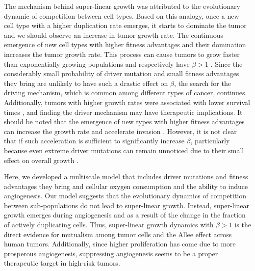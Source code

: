 \documentclass[aps,prl, superscriptaddress,groupedaddress]{revtex4}  %
\begin{document}
	The mechanism behind super-linear growth was attributed to the evolutionary dynamic of competition between cell types. Based on this analogy, once a new cell type with a higher duplication rate emerges, it starts to dominate the tumor and we should observe an increase in tumor growth rate. The continuous emergence of new cell types with higher fitness advantages and their domination increases the tumor growth rate. This process can cause tumors to grow faster than exponentially growing populations and respectively have $\beta>1$ \cite{durrett2010evolutionary, Victor2020superlinear}.  Since the considerably small probability of driver mutation and small fitness advantages they bring are unlikely to have such a drastic effect on $\beta$, the search for the driving mechanism, which is common among different types of cancer, continues. Additionally, tumors with higher growth rates were associated with lower survival times \cite{Victor2020superlinear}, and finding the driver mechanism may have therapeutic implications.  It should be noted that the emergence of new types with higher fitness advantages can increase the growth rate and accelerate invasion \cite{phillips2010evolutionarily,benichou2012front, hallatschek2014acceleration}. However,  it is not clear that if such acceleration is sufficient to significantly increase $\beta$, particularly because even extreme driver mutations can remain unnoticed due to their small effect on overall growth \cite{bozic2019measuring}.  
	
	Here, we developed a multiscale model that includes driver mutations and fitness advantages they bring and cellular oxygen consumption and the ability to induce angiogenesis. Our model suggests that the evolutionary dynamics of competition between sub-populations do not lead to super-linear growth. Instead, super-linear growth emerges during angiogenesis and as a result of the change in the fraction of actively duplicating cells. Thus, super-linear growth dynamics with $\beta>1$ is the direct evidence for mutualism among tumor cells and the Allee effect across human tumors. Additionally, since higher proliferation has come due to more prosperous angiogenesis, suppressing angiogenesis seems to be a proper therapeutic target in high-risk tumors. 
	
\end{document}
